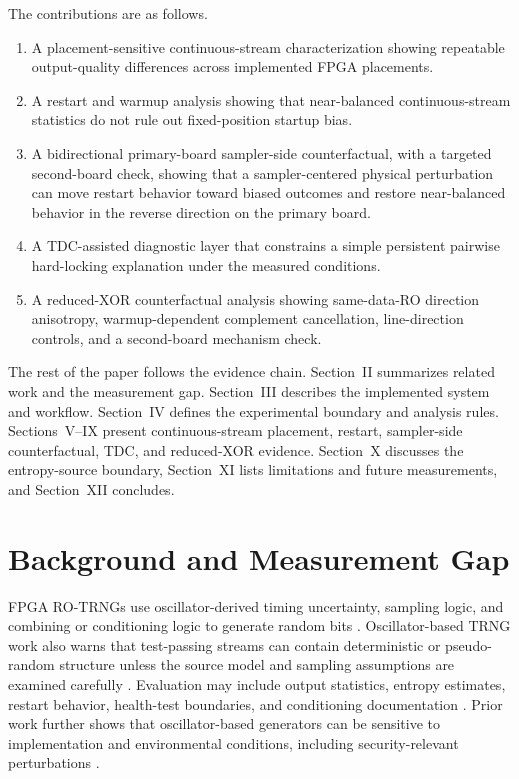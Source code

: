 \documentclass[journal]{IEEEtran}
\newcommand{\rotrng}{RO-TRNG}
\newcommand{\tdc}{TDC}
\begin{document}
The contributions are as follows.

\begin{enumerate}
  \item A placement-sensitive continuous-stream characterization showing repeatable output-quality differences across implemented FPGA placements.
  \item A restart and warmup analysis showing that near-balanced continuous-stream statistics do not rule out fixed-position startup bias.
  \item A bidirectional primary-board sampler-side counterfactual, with a targeted second-board check, showing that a sampler-centered physical perturbation can move restart behavior toward biased outcomes and restore near-balanced behavior in the reverse direction on the primary board.
  \item A \tdc{}-assisted diagnostic layer that constrains a simple persistent pairwise hard-locking explanation under the measured conditions.
  \item A reduced-XOR counterfactual analysis showing same-data-RO direction anisotropy, warmup-dependent complement cancellation, line-direction controls, and a second-board mechanism check.
\end{enumerate}

The rest of the paper follows the evidence chain. Section~II summarizes related work and the measurement gap. Section~III describes the implemented system and workflow. Section~IV defines the experimental boundary and analysis rules. Sections~V--IX present continuous-stream placement, restart, sampler-side counterfactual, \tdc{}, and reduced-XOR evidence. Section~X discusses the entropy-source boundary, Section~XI lists limitations and future measurements, and Section~XII concludes.

\section{Background and Measurement Gap}

FPGA \rotrng{}s use oscillator-derived timing uncertainty, sampling logic, and combining or conditioning logic to generate random bits \cite{Sunar_2007,Fischer_2008,Wold_2009,Bochard_2009}. Oscillator-based TRNG work also warns that test-passing streams can contain deterministic or pseudo-random structure unless the source model and sampling assumptions are examined carefully \cite{Baudet_2011,Bochard_2010}. Evaluation may include output statistics, entropy estimates, restart behavior, health-test boundaries, and conditioning documentation \cite{Turan_2018,Lubicz_2015,Lubicz_2024}. Prior work further shows that oscillator-based generators can be sensitive to implementation and environmental conditions, including security-relevant perturbations \cite{Markettos_2009,Fischer_2008}.
\end{document}
